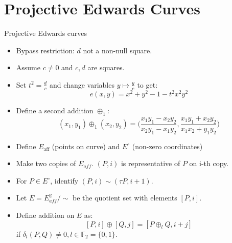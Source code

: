 \documentclass[10pt]{beamer}
\begin{document}
\section{Projective Edwards Curves}

\begin{frame}{Projective Edwards curves}
\begin{itemize}
	\item Bypass restriction: $d$ not a non-null square. 
	\item Assume $c \neq 0$ and $c,d$ are squares.
	\item Set $t^2 = \frac d c$ and change variables $y \mapsto \frac y c$ to get: \[e(x,y) = x^2+y^2-1-t^2x^2y^2\]
	\item Define a second addition $\oplus_1$: \[(x_1,y_1) \oplus_1 (x_2,y_2) = \Big(\frac{x_1y_1-x_2y_2}{x_2y_1 - x_1y_2},\frac{x_1y_1+x_2 y_2}{x_1 x_2 + y_1y_2}\Big)\]
\end{itemize}	
\vspace{0.5cm}
\pause
\begin{itemize}	
	\item Define $E_{\text{aff}}$ (points on curve) and $E^{\circ}$ (non-zero coordinates)
	\item Make two copies of $E_{aff}$. $(P,i)$ is representative of $P$ on i-th copy.
	\item For $P \in E^{\circ}$, identify $(P,i) \sim (\tau P, i+1)$.
	\item Let $E = E_{aff}^2 / \sim$ be the quotient set with elements $[P,i]$.
	\item Define addition on $E$ as: \[[P,i] \oplus [Q,j] = [P \oplus_l Q, i+j]\] if $\delta_l(P,Q) \neq 0, l \in \mathbb{F}_2 = \{0,1\}$. 
\end{itemize}
\end{frame}
\end{document}
